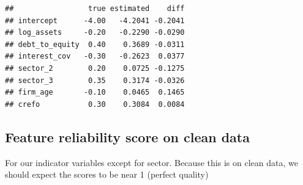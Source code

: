 \documentclass[
]{article}
\newenvironment{Shaded}{\begin{snugshade}}{\end{snugshade}}
\newcommand{\AttributeTok}[1]{\textcolor[rgb]{0.13,0.29,0.53}{#1}}
\newcommand{\CommentTok}[1]{\textcolor[rgb]{0.56,0.35,0.01}{\textit{#1}}}
\newcommand{\DecValTok}[1]{\textcolor[rgb]{0.00,0.00,0.81}{#1}}
\newcommand{\FunctionTok}[1]{\textcolor[rgb]{0.13,0.29,0.53}{\textbf{#1}}}
\newcommand{\NormalTok}[1]{#1}
\newcommand{\OtherTok}[1]{\textcolor[rgb]{0.56,0.35,0.01}{#1}}
\newcommand{\SpecialCharTok}[1]{\textcolor[rgb]{0.81,0.36,0.00}{\textbf{#1}}}
\newcommand{\StringTok}[1]{\textcolor[rgb]{0.31,0.60,0.02}{#1}}
\begin{document}
\begin{Shaded}
\end{Shaded}

\begin{verbatim}
##                 true estimated    diff
## intercept      -4.00   -4.2041 -0.2041
## log_assets     -0.20   -0.2290 -0.0290
## debt_to_equity  0.40    0.3689 -0.0311
## interest_cov   -0.30   -0.2623  0.0377
## sector_2        0.20    0.0725 -0.1275
## sector_3        0.35    0.3174 -0.0326
## firm_age       -0.10    0.0465  0.1465
## crefo           0.30    0.3084  0.0084
\end{verbatim}

\subsection{Feature reliability score on clean
data}\label{feature-reliability-score-on-clean-data}

For our indicator variables except for sector. Because this is on clean
data, we should expect the scores to be near 1 (perfect quality)

\begin{Shaded}
\end{Shaded}
\end{document}
